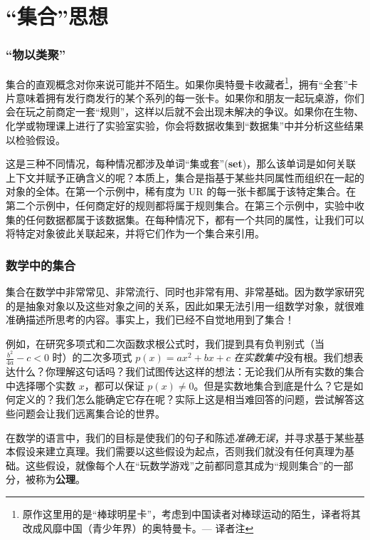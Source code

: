 \section{``集合''思想}

\subsubsection*{``物以类聚''}

集合的直观概念对你来说可能并不陌生。如果你奥特曼卡收藏者\footnote{原作这里用的是``棒球明星卡''，考虑到中国读者对棒球运动的陌生，译者将其改成风靡中国（青少年界）的奥特曼卡。--- 译者注}，拥有``全套''卡片意味着拥有发行商发行的某个系列的每一张卡。如果你和朋友一起玩桌游，你们会在玩之前商定一套``规则''，这样以后就不会出现未解决的争议。如果你在生物、化学或物理课上进行了实验室实验，你会将数据收集到``数据集''中并分析这些结果以检验假设。

这是三种不同情况，每种情况都涉及单词``集或套''(\textbf{set})，那么该单词是如何关联上下文并赋予正确含义的呢？本质上，集合是指基于某些共同属性而组织在一起的对象的全体。在第一个示例中，稀有度为 UR 的每一张卡都属于该特定集合。在第二个示例中，任何商定好的规则都将属于规则集合。在第三个示例中，实验中收集的任何数据都属于该数据集。在每种情况下，都有一个共同的属性，让我们可以将特定对象彼此关联起来，并将它们作为一个集合来引用。

\subsubsection*{数学中的集合}

集合在数学中非常常见、非常流行、同时也非常有用、非常基础。因为数学家研究的是抽象对象以及这些对象之间的关系，因此如果无法引用一组数学对象，就很难准确描述所思考的内容。事实上，我们已经不自觉地用到了集合！

例如，在研究多项式和二次函数求根公式时，我们提到具有负判别式（当 $\frac{b^2}{4a} - c < 0$ 时）的二次多项式 $p(x) = ax^2 + bx + c$ \emph{在实数集中}没有根。我们想表达什么？你理解这句话吗？我们试图传达这样的想法：无论我们从所有实数的集合中选择哪个实数 $x$，都可以保证 $p(x) \ne 0$。但是实数地集合到底是什么？它是如何定义的？我们怎么能确定它存在呢？实际上这是相当难回答的问题，尝试解答这些问题会让我们远离集合论的世界。

在数学的语言中，我们的目标是使我们的句子和陈述\emph{准确无误}，并寻求基于某些基本假设来建立真理。我们需要以这些假设为起点，否则我们就没有任何真理为基础。这些假设，就像每个人在``玩数学游戏''之前都同意其成为``规则集合''的一部分，被称为\textbf{公理}。

